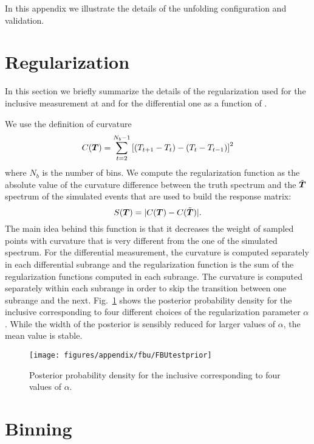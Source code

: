 In this appendix we illustrate the details of the unfolding
configuration and validation.

\section{Regularization}
\label{app:unfolding:regularization}
In this section we briefly summarize the details of the regularization
used for the inclusive \ac{} measurement at \seventev{} and for the
differential one as a function of \pttt{}.

We use the definition of curvature
%
\begin{equation}
        C(\boldsymbol{T}{}) =
        \sum_{t=2}^{N_b-1}\left[(T_{t+1}-T_{t})-(T_t-T_{t-1})\right]^2
\end{equation}
%
where $N_b$ is the number of bins. We compute the regularization
function as the absolute value of the curvature difference between the
truth spectrum and the $\tilde{\boldsymbol{T}{}}$ spectrum of the simulated
events that are used to build the response matrix:
%
\begin{equation}
 S(\boldsymbol{T}{}) = |C(\boldsymbol{T}) - C(\tilde{\boldsymbol{T}{}})|.
\end{equation}
%
The main idea behind this function is that it decreases the weight of
sampled points \Truth{} with curvature that is very different from
the one of the simulated spectrum.
For the differential measurement, the curvature is
computed separately in each differential subrange and the
regularization function is the sum of the regularization functions
computed in each subrange.  The curvature is computed
separately within each subrange in order to skip the transition
between one subrange and the next. 
Fig.~\ref{fig:app:fbutestprior} shows the posterior probability
density for the inclusive \ac{} corresponding to four different
choices of the regularization parameter $\alpha{}$.
While the width of the posterior is sensibly reduced for larger values
of $\alpha{}$, the mean value is stable.

\begin{figure}
  \begin{center}
  \texttt{[image: figures/appendix/fbu/FBUtestprior]}
  \caption{
    \label{fig:app:fbutestprior}
    Posterior probability density for the inclusive \ac{}
    corresponding to four values of $\alpha{}$.
    }
  \end{center}
\end{figure}

\section{Binning}
\label{app:unfolding:binning}


